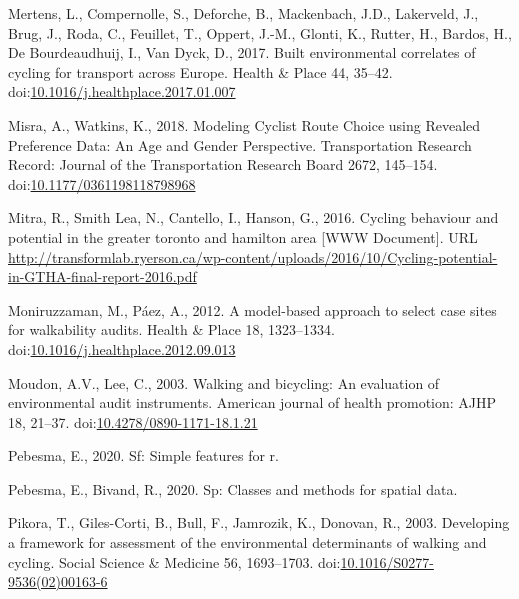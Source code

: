\documentclass[]{elsarticle} %
\begin{document}
\leavevmode\hypertarget{ref-mertensBuiltEnvironmentalCorrelates2017}{}%
Mertens, L., Compernolle, S., Deforche, B., Mackenbach, J.D., Lakerveld,
J., Brug, J., Roda, C., Feuillet, T., Oppert, J.-M., Glonti, K., Rutter,
H., Bardos, H., De Bourdeaudhuij, I., Van Dyck, D., 2017. Built
environmental correlates of cycling for transport across Europe. Health
\& Place 44, 35--42.
doi:\href{https://doi.org/10.1016/j.healthplace.2017.01.007}{10.1016/j.healthplace.2017.01.007}

\leavevmode\hypertarget{ref-misraModelingCyclistRoute2018}{}%
Misra, A., Watkins, K., 2018. Modeling Cyclist Route Choice using
Revealed Preference Data: An Age and Gender Perspective. Transportation
Research Record: Journal of the Transportation Research Board 2672,
145--154.
doi:\href{https://doi.org/10.1177/0361198118798968}{10.1177/0361198118798968}

\leavevmode\hypertarget{ref-Mitra2016}{}%
Mitra, R., Smith Lea, N., Cantello, I., Hanson, G., 2016. Cycling
behaviour and potential in the greater toronto and hamilton area {[}WWW
Document{]}. URL
\url{http://transformlab.ryerson.ca/wp-content/uploads/2016/10/Cycling-potential-in-GTHA-final-report-2016.pdf}

\leavevmode\hypertarget{ref-moniruzzamanModelbasedApproachSelect2012}{}%
Moniruzzaman, M., Páez, A., 2012. A model-based approach to select case
sites for walkability audits. Health \& Place 18, 1323--1334.
doi:\href{https://doi.org/10.1016/j.healthplace.2012.09.013}{10.1016/j.healthplace.2012.09.013}

\leavevmode\hypertarget{ref-moudonWalkingBicyclingEvaluation2003}{}%
Moudon, A.V., Lee, C., 2003. Walking and bicycling: An evaluation of
environmental audit instruments. American journal of health promotion:
AJHP 18, 21--37.
doi:\href{https://doi.org/10.4278/0890-1171-18.1.21}{10.4278/0890-1171-18.1.21}

\leavevmode\hypertarget{ref-R-sf}{}%
Pebesma, E., 2020. Sf: Simple features for r.

\leavevmode\hypertarget{ref-R-sp}{}%
Pebesma, E., Bivand, R., 2020. Sp: Classes and methods for spatial data.

\leavevmode\hypertarget{ref-pikoraDevelopingFrameworkAssessment2003}{}%
Pikora, T., Giles-Corti, B., Bull, F., Jamrozik, K., Donovan, R., 2003.
Developing a framework for assessment of the environmental determinants
of walking and cycling. Social Science \& Medicine 56, 1693--1703.
doi:\href{https://doi.org/10.1016/S0277-9536(02)00163-6}{10.1016/S0277-9536(02)00163-6}
\end{document}
